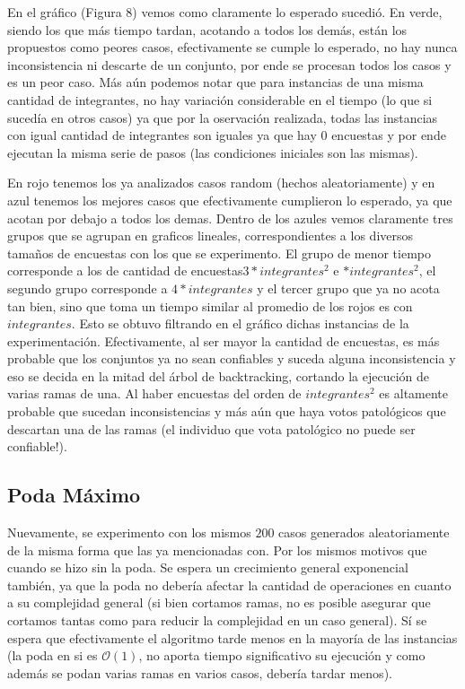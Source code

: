 \documentclass[A4paper,oneside,fleqn,10pt]{article}
\theoremstyle{definition}
\begin{document}
En el gráfico (Figura 8) vemos como claramente lo esperado sucedió. En verde, siendo los que más tiempo tardan, acotando a todos los demás, están los propuestos como peores casos, efectivamente se cumple lo esperado, no hay nunca inconsistencia ni descarte de un conjunto, por ende se procesan todos los casos y es un peor caso. Más aún podemos notar que para instancias de una misma cantidad de integrantes, no hay variación considerable en el tiempo (lo que si sucedía en otros casos) ya que por la oservación realizada, todas las instancias con igual cantidad de integrantes son iguales ya que hay 0 encuestas y por ende ejecutan la misma serie de pasos (las condiciones iniciales son las mismas).

 En rojo tenemos los ya analizados casos random (hechos aleatoriamente) y en azul tenemos los mejores casos que efectivamente cumplieron lo esperado, ya que acotan por debajo a todos los demas. Dentro de los azules vemos claramente tres grupos que se agrupan en graficos lineales, correspondientes a los diversos tamaños de encuestas con los que se experimento. El grupo de menor tiempo corresponde a los de cantidad de encuestas$3*integrantes^2$ e $*integrantes^2$, el segundo grupo corresponde a $4*integrantes$ y el tercer grupo que ya no acota tan bien, sino que toma un tiempo similar al promedio de los rojos es con $integrantes$. Esto se obtuvo filtrando en el gráfico dichas instancias de la experimentación. Efectivamente, al ser mayor la cantidad de encuestas, es más probable que los conjuntos ya no sean confiables y suceda alguna inconsistencia y eso se decida en la mitad del árbol de backtracking, cortando la ejecución de varias ramas de una. Al haber encuestas del orden de $integrantes^2$ es altamente probable que sucedan inconsistencias y más aún que haya votos patológicos que descartan una de las ramas (el individuo que vota patológico no puede ser confiable!).



\subsection{Poda Máximo}
Nuevamente, se experimento con los mismos $200$ casos generados aleatoriamente de la misma forma que las ya mencionadas con. Por los mismos motivos que cuando se hizo sin la poda. Se espera un crecimiento general exponencial también, ya que la poda no debería afectar la cantidad de operaciones en cuanto a su complejidad general (si bien cortamos ramas, no es posible asegurar que cortamos tantas como para reducir la complejidad en un caso general). Sí se espera que efectivamente el algoritmo tarde menos en la mayoría de las instancias (la poda en si es $\mathcal{O}(1)$, no aporta tiempo significativo su ejecución y como además se podan varias ramas en varios casos, debería tardar menos).
\end{document}
